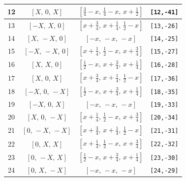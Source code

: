 \documentclass[fleqn,8pt]{jsarticle}
\begin{document}
\begin{longtable}{cccc}
12 & $\left[ X,\, 0,\, X \right]$ & $\left[ \frac{3}{4} - x,\, \frac{1}{4} - x,\, x + \frac{1}{2} \right]$ & {\tt [12,-41]} \\ \hline
13 & $\left[ - X,\, X,\, 0 \right]$ & $\left[ x + \frac{3}{4},\, x + \frac{1}{4},\, \frac{1}{2} - x \right]$ & {\tt [13,-26]} \\ \hline
14 & $\left[ X,\, - X,\, 0 \right]$ & $\left[ - x,\, - x,\, - x \right]$ & {\tt [14,-25]} \\ \hline
15 & $\left[ - X,\, - X,\, 0 \right]$ & $\left[ x + \frac{1}{4},\, \frac{1}{2} - x,\, x + \frac{3}{4} \right]$ & {\tt [15,-27]} \\ \hline
16 & $\left[ X,\, X,\, 0 \right]$ & $\left[ \frac{1}{2} - x,\, x + \frac{3}{4},\, x + \frac{1}{4} \right]$ & {\tt [16,-28]} \\ \hline
17 & $\left[ X,\, 0,\, X \right]$ & $\left[ x + \frac{3}{4},\, x + \frac{1}{4},\, \frac{1}{2} - x \right]$ & {\tt [17,-36]} \\ \hline
18 & $\left[ - X,\, 0,\, - X \right]$ & $\left[ \frac{1}{2} - x,\, x + \frac{3}{4},\, x + \frac{1}{4} \right]$ & {\tt [18,-35]} \\ \hline
19 & $\left[ - X,\, 0,\, X \right]$ & $\left[ - x,\, - x,\, - x \right]$ & {\tt [19,-33]} \\ \hline
20 & $\left[ X,\, 0,\, - X \right]$ & $\left[ x + \frac{1}{4},\, \frac{1}{2} - x,\, x + \frac{3}{4} \right]$ & {\tt [20,-34]} \\ \hline
21 & $\left[ 0,\, - X,\, - X \right]$ & $\left[ x + \frac{3}{4},\, x + \frac{1}{4},\, \frac{1}{2} - x \right]$ & {\tt [21,-31]} \\ \hline
22 & $\left[ 0,\, X,\, X \right]$ & $\left[ x + \frac{1}{4},\, \frac{1}{2} - x,\, x + \frac{3}{4} \right]$ & {\tt [22,-32]} \\ \hline
23 & $\left[ 0,\, - X,\, X \right]$ & $\left[ \frac{1}{2} - x,\, x + \frac{3}{4},\, x + \frac{1}{4} \right]$ & {\tt [23,-30]} \\ \hline
24 & $\left[ 0,\, X,\, - X \right]$ & $\left[ - x,\, - x,\, - x \right]$ & {\tt [24,-29]} \\
\end{longtable}
\renewcommand{\arraystretch}{1.2}
\end{document}
